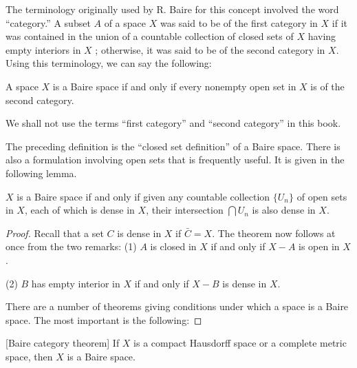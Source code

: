 The terminology originally used by R. Baire for this concept involved the word ``category.'' A subset \(A\) of a space \(X\) was said to be of the first category in \(X\) if it was contained in the union of a countable collection of closed sets of \(X\) having empty interiors in \(X\) ; otherwise, it was said to be of the second category in \(X\). Using this terminology, we can say the following:

A space \(X\) is a Baire space if and only if every nonempty open set in \(X\) is of the second category.

We shall not use the terms ``first category'' and ``second category'' in this book.

The preceding definition is the ``closed set definition'' of a Baire space. There is also a formulation involving open sets that is frequently useful. It is given in the following lemma.

\begin{lemma}
\label{lem:\thetheorem}
\(X\) is a Baire space if and only if given any countable collection \(\{ U_{n}\}\) of open sets in \(X\), each of which is dense in \(X\), their intersection \(\bigcap {U}_{n}\) is also dense in \(X\).
\end{lemma}

\begin{proof}
Recall that a set \(C\) is dense in \(X\) if \(\bar{C} = X\). The theorem now follows at once from the two remarks:
(1) \(A\) is closed in \(X\) if and only if \(X - A\) is open in \(X\).

(2) \(B\) has empty interior in \(X\) if and only if \(X - B\) is dense in \(X\).

There are a number of theorems giving conditions under which a space is a Baire space. The most important is the following:
\end{proof}
\begin{theorem}
\label{thm:\thetheorem}[Baire category theorem]
If \(X\) is a compact Hausdorff space or a complete metric space, then \(X\) is a Baire space.
\end{theorem}

